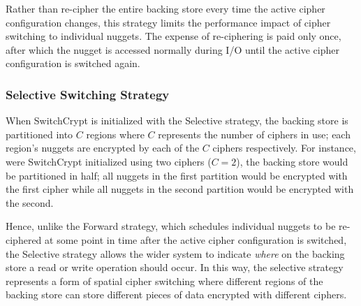 Rather than re-cipher the entire backing store every time the active cipher
configuration changes, this strategy limits the performance impact of cipher
switching to individual nuggets. The expense of re-ciphering is paid only once,
after which the nugget is accessed normally during I/O until the active cipher
configuration is switched again.


\subsubsection{Selective Switching Strategy}

When SwitchCrypt is initialized with the Selective strategy, the backing store
is partitioned into $C$ regions where $C$ represents the number of ciphers in
use; each region's nuggets are encrypted by each of the $C$ ciphers
respectively. For instance, were SwitchCrypt initialized using two ciphers ($C =
2$), the backing store would be partitioned in half; all nuggets in the first
partition would be encrypted with the first cipher while all nuggets in the
second partition would be encrypted with the second.

Hence, unlike the Forward strategy, which schedules individual nuggets to be
re-ciphered at some point in time after the active cipher configuration is
switched, the Selective strategy allows the wider system to indicate
\emph{where} on the backing store a read or write operation should occur. In
this way, the selective strategy represents a form of spatial cipher switching
where different regions of the backing store can store different pieces of data
encrypted with different ciphers.

